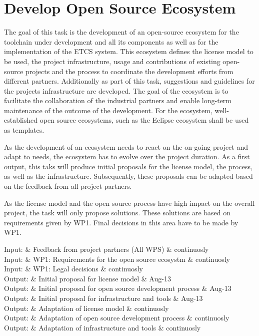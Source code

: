 \documentclass{template/openetcs_article}
\begin{document}
\section{Develop Open Source Ecosystem}
The goal of this task is the development of an open-source ecosystem for the toolchain under development and all its components as well as for the implementation of the ETCS system. This ecosystem defines the license model to be used, the project infrastructure, usage and contributions of existing open-source projects and the process to coordinate the development efforts from different partners. Additionally as part of this task, suggestions and guidelines for the projects infrastructure are developed. The goal of the ecosystem is to facilitate the collaboration of the industrial partners and enable long-term maintenance of the outcome of the development. For the ecosystem, well-established open source ecosystems, such as the Eclipse ecosystem shall be used as templates.

As the development of an ecosystem needs to react on the on-going project and adapt to needs, the ecosystem has to evolve over the project duration. As a first output, this taks will produce initial proposals for the license model, the process, as well as the infrastructure. Subsequently, these proposals can be adapted based on the feedback from all project partners.

As the license model and the open source process have high impact on the overall project, the task will only propose solutions. These solutions are based on requirements given by WP1. Final decisions in this area have to be made by WP1. 

\begin{inoutput}
Input: & Feedback from project partners (All WPS) & continuosly \\
Input: & WP1: Requirements for the open source ecosystm & continuosly \\
Input: & WP1: Legal decisions & continuosly \\
\hline
Output: & Initial proposal for license model & Aug-13 \\
Output: & Initial proposal for open source development process & Aug-13 \\
Output: & Initial proposal for infrastructure and tools & Aug-13 \\
Output: & Adaptation of license model & continuosly \\
Output: & Adaptation of open source development process & continuosly \\
Output: & Adaptation of infrastructure and tools & continuosly \\
\end{inoutput}
\end{document}
